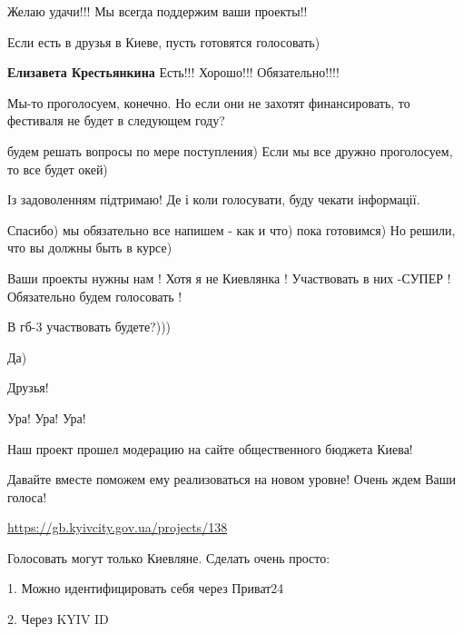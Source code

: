 
Желаю удачи!!! Мы всегда поддержим ваши проекты!!

\begin{itemize} %

Если есть в друзья в Киеве, пусть готовятся голосовать)

\textbf{Елизавета Крестьянкина} Есть!!! Хорошо!!! Обязательно!!!!
\end{itemize} %


Мы-то проголосуем, конечно. Но если они не захотят финансировать, то фестиваля
не будет в следующем году?

\begin{itemize} %

будем решать вопросы по мере поступления) Если мы все дружно проголосуем, то все будет окей)
\end{itemize} %


Із задоволенням підтримаю! Де і коли голосувати, буду чекати інформації.

\begin{itemize} %

Спасибо) мы обязательно все напишем - как и что) пока готовимся) Но решили, что вы должны быть в курсе)
\end{itemize} %


Ваши проекты нужны нам ! Хотя я не Киевлянка ! Участвовать в них -СУПЕР !
Обязательно будем голосовать !


В гб-3 участвовать будете?)))

\begin{itemize} %

Да)
\end{itemize} %


Друзья!\par
Ура! Ура! Ура!\par
Наш проект прошел модерацию на сайте общественного бюджета Киева!\par
Давайте вместе поможем ему реализоваться на новом уровне! Очень ждем Ваши голоса!\par
\url{https://gb.kyivcity.gov.ua/projects/138}\par
Голосовать могут только Киевляне. Сделать очень просто:\par
1. Можно идентифицировать себя через Приват24\par
2. Через KYIV ID\par

